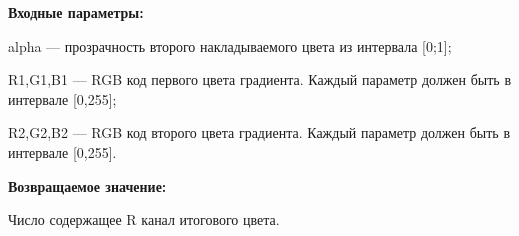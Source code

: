 \textbf{Входные параметры:}  

alpha --- прозрачность второго накладываемого цвета из интервала [0;1];
 
    R1,G1,B1 --- RGB код первого цвета градиента. Каждый параметр должен быть в интервале [0,255];
 
    R2,G2,B2 --- RGB код второго цвета градиента. Каждый параметр должен быть в интервале [0,255].

\textbf{Возвращаемое значение:}

Число содержащее R канал итогового цвета.